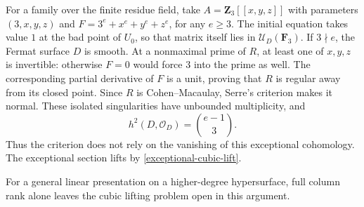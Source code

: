 For a family over the finite residue field, take
$A=\mathbf Z_3[[x,y,z]]$ with parameters $(3,x,y,z)$ and
$F=3^e+x^e+y^e+z^e$, for any $e\ge3$.
The initial equation takes value $1$ at the bad point of $U_0$, so
that matrix itself lies in $\mathcal U_D(\mathbf F_3)$.
If $3\nmid e$, the Fermat surface $D$ is smooth.
At a nonmaximal prime of $R$, at least one of $x,y,z$ is invertible:
otherwise $F=0$ would force $3$ into the prime as well.
The corresponding partial derivative of $F$ is a unit, proving that
$R$ is regular away from its closed point.
Since $R$ is Cohen--Macaulay, Serre's criterion makes it normal.
These isolated singularities have unbounded multiplicity, and
\[
 h^2(D,\mathcal O_D)=\binom{e-1}{3}.
\]
Thus the criterion does not rely on the vanishing of this exceptional
cohomology.  The exceptional section lifts by \eqref{exceptional-cubic-lift}.

For a general linear presentation on a higher-degree hypersurface, full column rank alone leaves the cubic lifting problem open in this argument.
